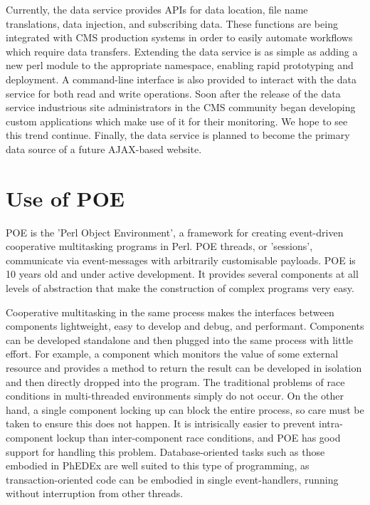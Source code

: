 \documentclass{PoS}
\begin{document}
Currently, the data service provides APIs for data location, file name
translations, data injection, and subscribing data.  These functions
are being integrated with CMS production systems in order to easily
automate workflows which require data transfers.  Extending the data
service is as simple as adding a new perl module to the appropriate
namespace, enabling rapid prototyping and deployment.  A command-line
interface is also provided to interact with the data service for both
read and write operations.  Soon after the release of the data service
industrious site administrators in the CMS community began developing
custom applications which make use of it for their monitoring.  We
hope to see this trend continue.  Finally, the data service is planned
to become the primary data source of a future AJAX-based website.

\section{Use of POE}

POE \cite{poe} is the 'Perl Object Environment', a framework for creating
event-driven cooperative multitasking programs in Perl. POE threads,
or 'sessions', communicate via event-messages with arbitrarily
customisable payloads. POE is 10 years old and under active
development. It provides several components at all levels of
abstraction that make the construction of complex programs very easy.

Cooperative multitasking in the same process makes the interfaces
between components lightweight, easy to develop and debug, and
performant. Components can be developed standalone and then plugged
into the same process with little effort. For example, a component
which monitors the value of some external resource and provides a
method to return the result can be developed in isolation and then
directly dropped into the program. The traditional problems of race
conditions in multi-threaded environments simply do not occur. On the
other hand, a single component locking up can block the entire
process, so care must be taken to ensure this does not happen. It is
intrisically easier to prevent intra-component lockup than
inter-component race conditions, and POE has good support for handling
this problem.  Database-oriented tasks such as those embodied in
PhEDEx are well suited to this type of programming, as
transaction-oriented code can be embodied in single event-handlers,
running without interruption from other threads.
\end{document}
